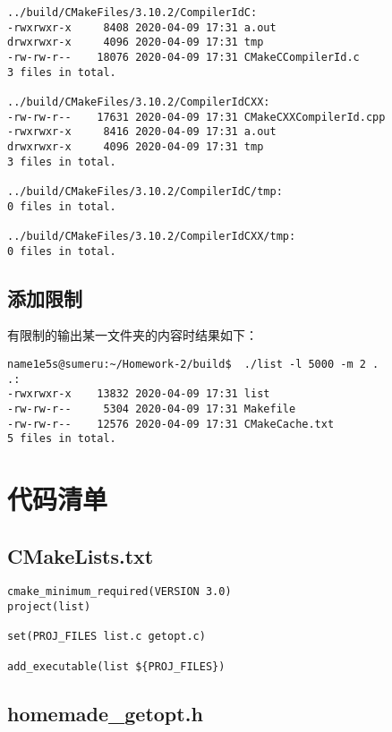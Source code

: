\documentclass[blue,normal,cn]{elegantnote}
\begin{document}
\begin{lstlisting}
../build/CMakeFiles/3.10.2/CompilerIdC:
-rwxrwxr-x     8408 2020-04-09 17:31 a.out
drwxrwxr-x     4096 2020-04-09 17:31 tmp
-rw-rw-r--    18076 2020-04-09 17:31 CMakeCCompilerId.c
3 files in total.

../build/CMakeFiles/3.10.2/CompilerIdCXX:
-rw-rw-r--    17631 2020-04-09 17:31 CMakeCXXCompilerId.cpp
-rwxrwxr-x     8416 2020-04-09 17:31 a.out
drwxrwxr-x     4096 2020-04-09 17:31 tmp
3 files in total.

../build/CMakeFiles/3.10.2/CompilerIdC/tmp:
0 files in total.

../build/CMakeFiles/3.10.2/CompilerIdCXX/tmp:
0 files in total.
\end{lstlisting}

\subsection{添加限制}
有限制的输出某一文件夹的内容时结果如下：

\begin{lstlisting}
name1e5s@sumeru:~/Homework-2/build$  ./list -l 5000 -m 2 .
.:
-rwxrwxr-x    13832 2020-04-09 17:31 list
-rw-rw-r--     5304 2020-04-09 17:31 Makefile
-rw-rw-r--    12576 2020-04-09 17:31 CMakeCache.txt
5 files in total.

\end{lstlisting}

\appendix
\section{代码清单}

\subsection{CMakeLists.txt}

\begin{lstlisting}
cmake_minimum_required(VERSION 3.0)
project(list)

set(PROJ_FILES list.c getopt.c)

add_executable(list ${PROJ_FILES})
\end{lstlisting}

\subsection{homemade\_getopt.h}
\end{document}
